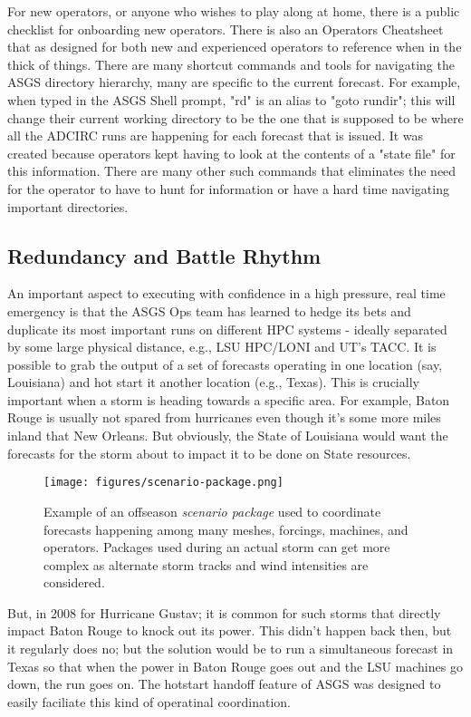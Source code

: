 \documentclass{article}
\begin{document}
For new operators, or anyone who wishes to play along at home, there is a public
checklist for onboarding new operators. There is also an Operators
Cheatsheet\cite{asgs-cheat-sheet} that as designed for both new and experienced
operators to reference when in the thick of things. There are many shortcut
commands and tools for navigating the ASGS directory hierarchy, many are
specific to the current forecast. For example, when typed in the ASGS Shell
prompt, "rd" is an alias to "goto rundir"; this will change their current
working directory to be the one that is supposed to be where all the ADCIRC runs
are happening for each forecast that is issued. It was created because operators
kept having to look at the contents of a "state file" for this information.
There are many other such commands that eliminates the need for the operator to
have to hunt for information or have a hard time navigating important
directories.

\subsection{Redundancy and Battle Rhythm}

An important aspect to executing with confidence in a high pressure, real time
emergency is that the ASGS Ops team has learned to hedge its bets and duplicate
its most important runs on different HPC systems - ideally separated by some
large physical distance, e.g., LSU HPC/LONI and UT's TACC. It is possible to
grab the output of a set of forecasts operating in one location (say, Louisiana)
and hot start it another location (e.g., Texas). This is crucially important
when a storm is heading towards a specific area. For example, Baton Rouge is
usually not spared from hurricanes even though it's some more miles inland that
New Orleans. But obviously, the State of Louisiana would want the forecasts for
the storm about to impact it to be done on State resources.

\begin{figure}
\centering
\texttt{[image: figures/scenario-package.png]}
\caption{\label{fig:package} Example of an offseason \textit{scenario package} used to coordinate forecasts happening among many meshes, forcings, machines, and operators. Packages used during an actual storm can get more complex as alternate storm tracks and wind intensities are considered.}
\end{figure}

But, in 2008 for Hurricane Gustav; it is common for such storms that directly
impact Baton Rouge to knock out its power. This didn't happen back then, but it
regularly does no; but the solution would be to run a simultaneous forecast in
Texas so that when the power in Baton Rouge goes out and the LSU machines go
down, the run goes on. The hotstart handoff feature of ASGS was designed to
easily faciliate this kind of operatinal coordination.
\end{document}
